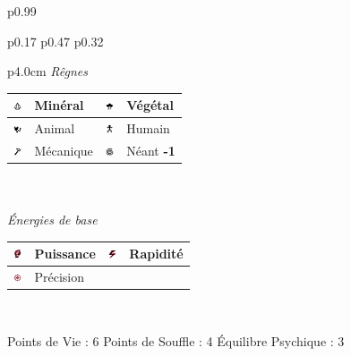 \documentclass[11pt,twoside,a4paper]{article}
\def\imgMINER{\includegraphics[width=0.25cm]{../../../../../imgGraphics/rolePlayingGame/SimulacreS/mini12x12/mineral.png} }
\def\imgVEGET{\includegraphics[width=0.25cm]{../../../../../imgGraphics/rolePlayingGame/SimulacreS/mini12x12/vegetal.png} }
\def\imgANIMA{\includegraphics[width=0.25cm]{../../../../../imgGraphics/rolePlayingGame/SimulacreS/mini12x12/animal.png} }
\def\imgHUMAI{\includegraphics[width=0.25cm]{../../../../../imgGraphics/rolePlayingGame/SimulacreS/mini12x12/humain.png} }
\def\imgMECAN{\includegraphics[width=0.25cm]{../../../../../imgGraphics/rolePlayingGame/SimulacreS/mini12x12/mecanique.png} }
\def\imgNEANT{\includegraphics[width=0.25cm]{../../../../../imgGraphics/rolePlayingGame/SimulacreS/mini12x12/neant.png} }
\def\imgPUISS{\includegraphics[width=0.25cm]{../../../../../imgGraphics/rolePlayingGame/SimulacreS/mini12x12/puissance.png} }
\def\imgRAPID{\includegraphics[width=0.25cm]{../../../../../imgGraphics/rolePlayingGame/SimulacreS/mini12x12/rapidite.png} }
\def\imgPRECI{\includegraphics[width=0.25cm]{../../../../../imgGraphics/rolePlayingGame/SimulacreS/mini12x12/precision.png} }
\begin{document}
\begin{longtable}[ht]{ p{} }
\begin{tabular}[h]{ p{} p{} p{} }
			\begin{tabular}[h]{ p{4.0cm} }
				\emph{R{\^e}gnes}  \\
				{\footnotesize %
				\begin{tabular}[h]{|p{0.25cm}|p{1.50cm}|p{0.25cm}|p{1.50cm}|}
					\hline
					\imgMINER 	& Min{\'e}ral		\newline 1	 & \imgVEGET	& V{\'e}g{\'e}tal		\newline 0					\\
					\hline
					\imgANIMA 	& Animal			\newline 0	 & \imgHUMAI	& Humain				\newline 2					\\
					\hline
					\imgMECAN	& M{\'e}canique		\newline 2	 & \imgNEANT	& N{\'e}ant				\newline \textbf{-1}		\\ 
					\hline
				\end{tabular} } \\
				\\
				\emph{{\'E}nergies de base} \\
				{\footnotesize %
				\begin{tabular}[h]{|p{0.25cm}|p{1.50cm}|p{0.25cm}|p{1.50cm}|}
					\hline
					\imgPUISS	& Puissance			\newline 0	 & \imgRAPID	& Rapidit{\'e}			\newline 1				\\
					\hline
					\imgPRECI	& Pr{\'e}cision		\newline 0	 &				&												\\
					\hline
				\end{tabular} } \\
			\end{tabular}
			\newline \newline \newline 
			Points de Vie : 6			\newline
			Points de Souffle : 4		\newline
			{\'E}quilibre Psychique : 3	\newline
		\\ %

\end{tabular}
\end{longtable}
\end{document}
